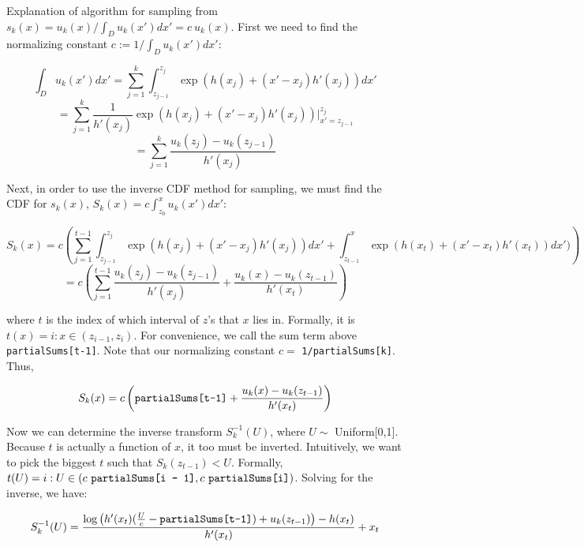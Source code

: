 \documentclass{article}
\begin{document}
Explanation of algorithm for sampling from $s_k(x) = u_k(x) / \int_D u_k(x') dx' = c \ u_k(x)$. First we need to find the normalizing constant $c := 1 / \int_D u_k(x') dx':$

$$
\int_D u_k(x') dx' = \sum_{j = 1}^k \int_{z_{j-1}}^{z_j} \exp(h(x_j) + (x' - x_j) h'(x_j)) dx'
$$
$$
 = \sum_{j = 1}^k \frac{1}{h'(x_j)} \exp(h(x_j) + (x' - x_j) h'(x_j)) \bigg\rvert^{z_j}_{x' = z_{j - 1}}
$$
$$
 = \sum_{j = 1}^k \frac{u_k(z_j) - u_k(z_{j-1})}{h'(x_j)}
$$

Next, in order to use the inverse CDF method for sampling, we must find the CDF for $s_k(x)$, $S_k(x) = c \int_{z_0}^x u_k(x') dx'$:

$$
S_k(x) = c \left(\sum_{j = 1}^{t - 1} \int_{z_{j-1}}^{z_j} \exp(h(x_j) + (x' - x_j) h'(x_j)) dx' + \int_{z_{t-1}}^x \exp(h(x_t) + (x' - x_t) h'(x_t)) dx') \right)
$$
$$
 = c \left( \sum_{j = 1}^{t-1} \frac{u_k(z_j) - u_k(z_{j-1})}{h'(x_j)} + \frac{u_k(x) - u_k(z_{t-1})}{h'(x_t)} \right)
$$

\noindent where $t$ is the index of which interval of $z$'s that $x$ lies in. Formally, it is $t(x) = i : x \in (z_{i-1}, z_i)$. For convenience, we call the sum term above \texttt{partialSums[t-1]}. Note that our normalizing constant $c =$ \texttt{1/partialSums[k]}. Thus,

$$
S_k(x) = c \left(\text{\texttt{partialSums[t-1]}} + \frac{u_k(x) - u_k(z_{t-1})}{h'(x_t)} \right)
$$

Now we can determine the inverse transform $S_k^{-1}(U)$, where $U \sim$ Uniform[0,1]. Because $t$ is actually a function of $x$, it too must be inverted. Intuitively, we want to pick the biggest $t$ such that $S_k(z_{t-1}) < U$. Formally, $t(U) = i : U \in (c\ \text{\texttt{partialSums[i - 1]}}, c\ \text{\texttt{partialSums[i]}})$. Solving for the inverse, we have:

$$
S_k^{-1}(U) = \frac{\log\left(h'(x_t) (\frac{U}{c} - \text{\texttt{partialSums[t-1]}}) + u_k(z_{t-1})\right) - h(x_t)}{h'(x_t)} + x_t
$$
\end{document}
